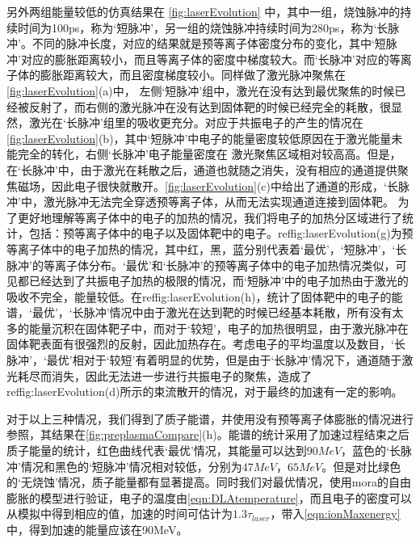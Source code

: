 另外两组能量较低的仿真结果在 \ref{fig:laserEvolution} 中，其中一组，烧蚀脉冲的持续时间为100ps，称为‘短脉冲’，另一组的烧蚀脉冲持续时间为280ps，称为‘长脉冲’。不同的脉冲长度，对应的结果就是预等离子体密度分布的变化，其中‘短脉冲’对应的膨胀距离较小，而且等离子体的密度中梯度较大。而‘长脉冲’对应的等离子体的膨胀距离较大，而且密度梯度较小。同样做了激光脉冲聚焦在\ref{fig:laserEvolution}(a)中， 左侧‘短脉冲’组中，激光在没有达到最优聚焦的时候已经被反射了，而右侧的激光脉冲在没有达到固体靶的时候已经完全的耗散，很显然，激光在‘长脉冲’组里的吸收更充分。对应于共振电子的产生的情况在\ref{fig:laserEvolution}(b)，其中‘短脉冲’中电子的能量密度较低原因在于激光能量未能完全的转化，右侧‘长脉冲’电子能量密度在 激光聚焦区域相对较高高。但是， 在‘长脉冲’中，由于激光在耗散之后，通道也就随之消失，没有相应的通道提供聚焦磁场，因此电子很快就散开。\ref{fig:laserEvolution}(c)中给出了通道的形成，‘长脉冲’中，激光脉冲无法完全穿透预等离子体，从而无法实现通道连接到固体靶。 为了更好地理解等离子体中的电子的加热的情况，我们将电子的加热分区域进行了统计，包括：预等离子体中的电子以及固体靶中的电子。ref{fig:laserEvolution}(g)为预等离子体中的电子加热的情况，其中红，黑，蓝分别代表着‘最优’，‘短脉冲’，‘长脉冲’的等离子体分布。‘最优’和‘长脉冲’的预等离子体中的电子加热情况类似，可见都已经达到了共振电子加热的极限的情况，而‘短脉冲’中的电子加热由于激光的吸收不完全，能量较低。在ref{fig:laserEvolution}(h)，统计了固体靶中的电子的能谱，‘最优’，‘长脉冲’情况中由于激光在达到靶的时候已经基本耗散，所有没有太多的能量沉积在固体靶子中，而对于‘较短’，电子的加热很明显，由于激光脉冲在固体靶表面有很强烈的反射，因此加热存在。考虑电子的平均温度以及数目，‘长脉冲’，‘最优’相对于‘较短’有着明显的优势，但是由于‘长脉冲’情况下，通道随于激光耗尽而消失，因此无法进一步进行共振电子的聚焦，造成了ref{fig:laserEvolution}(d)所示的束流散开的情况，对于最终的加速有一定的影响。



对于以上三种情况，我们得到了质子能谱，并使用没有预等离子体膨胀的情况进行参照，其结果在\ref{fig:preplasmaCompare}(h)。能谱的统计采用了加速过程结束之后质子能量的统计，红色曲线代表‘最优’情况，其能量可以达到$90MeV$，蓝色的‘长脉冲’情况和黑色的‘短脉冲’情况相对较低，分别为$47MeV$，$65MeV$。但是对比绿色的‘无烧蚀’情况，质子能量都有显著提高。同时我们对最优情况，使用mora的自由膨胀的模型进行验证，电子的温度由\ref{eqn:DLAtemperature}，而且电子的密度可以从模拟中得到相应的值，加速的时间可估计为$1.3 \tau_{laser}$\cite{fuchs2006laser}，带入\ref{eqn:ionMaxenergy}中，得到加速的能量应该在90MeV。



